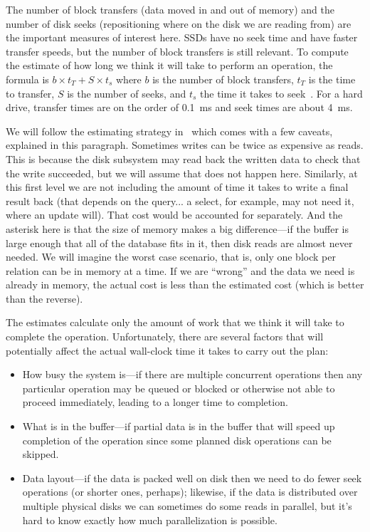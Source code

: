 \documentclass[a4paper]{report}
\begin{document}
The number of block transfers (data moved in and out of memory) and the number of disk seeks (repositioning where on the disk we are reading from) are the important measures of interest here. SSDs have no seek time and have faster transfer speeds, but the number of block transfers is still relevant. To compute the estimate of how long we think it will take to perform an operation, the formula is $b \times t_{T} + S \times t_{s}$ where $b$ is the number of block transfers, $t_{T}$ is the time to transfer, $S$ is the number of seeks, and $t_{s}$ the time it takes to seek~\cite{dsc}. For a hard drive, transfer times are on the order of 0.1~ms and seek times are about 4~ms.

We will follow the estimating strategy in~\cite{dsc} which comes with a few caveats, explained in this paragraph. Sometimes writes can be twice as expensive as reads. This is because the disk subsystem may read back the written data to check that the write succeeded, but we will assume that does not happen here. Similarly, at this first level we are not including the amount of time it takes to write a final result back (that depends on the query... a select, for example, may not need it, where an update will). That cost would be accounted for separately. And the asterisk here is that the size of memory makes a big difference---if the buffer is large enough that all of the database fits in it, then disk reads are almost never needed. We will imagine the worst case scenario, that is, only one block per relation can be in memory at a time. If we are ``wrong'' and the data we need is already in memory, the actual cost is less than the estimated cost (which is better than the reverse). 

The estimates calculate only the amount of work that we think it will take to complete the operation. Unfortunately, there are several factors that will potentially affect the actual wall-clock time it takes to carry out the plan:

\begin{itemize}
	\item How busy the system is---if there are multiple concurrent operations then any particular operation may be queued or blocked or otherwise not able to proceed immediately, leading to a longer time to completion.
	\item What is in the buffer---if partial data is in the buffer that will speed up completion of the operation since some planned disk operations can be skipped.
	\item Data layout---if the data is packed well on disk then we need to do fewer seek operations (or shorter ones, perhaps); likewise, if the data is distributed over multiple physical disks we can sometimes do some reads in parallel, but it's hard to know exactly how much parallelization is possible.
\end{itemize}
\end{document}
